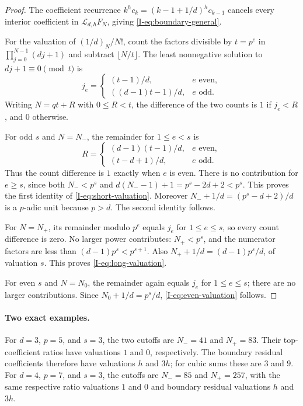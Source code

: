 \documentclass[11pt,letterpaper]{article}
\numberwithin{equation}{section}
\begin{document}
\begin{proof}
The coefficient recurrence
$k^hc_k=(k-1+1/d)^hc_{k-1}$ cancels every interior coefficient
in $\mathcal L_{d,h}F_N$, giving \eqref{I-eq:boundary-general}.

For the valuation of $(1/d)_N/N!$, count the factors divisible by
$t=p^e$ in $\prod_{j=0}^{N-1}(dj+1)$ and subtract $\lfloor N/t\rfloor$.
The least nonnegative solution to $dj+1\equiv0\pmod t$ is
\[
 j_e=\begin{cases}
 (t-1)/d,&e\text{ even},\\
 ((d-1)t-1)/d,&e\text{ odd}.
 \end{cases}
\]
Writing $N=qt+R$ with $0\leq R<t$, the difference of the two counts
is $1$ if $j_e<R$, and $0$ otherwise.

For odd $s$ and $N=N_-$, the remainder for $1\leq e<s$ is
\[
 R=\begin{cases}
 (d-1)(t-1)/d,&e\text{ even},\\
 (t-d+1)/d,&e\text{ odd}.
 \end{cases}
\]
Thus the count difference is $1$ exactly when $e$ is even.
There is no contribution for $e\geq s$, since both $N_-<p^s$ and
$d(N_--1)+1=p^s-2d+2<p^s$. This proves the first identity
of \eqref{I-eq:short-valuation}. Moreover
$N_-+1/d=(p^s-d+2)/d$ is a $p$-adic unit because $p>d$.
The second identity follows.

For $N=N_+$, its remainder modulo $p^e$ equals $j_e$ for
$1\leq e\leq s$, so every count difference is zero. No larger
power contributes: $N_+<p^s$, and the numerator factors are
less than $(d-1)p^s<p^{s+1}$. Also
$N_++1/d=(d-1)p^s/d$, of valuation $s$.
This proves \eqref{I-eq:long-valuation}.

For even $s$ and $N=N_0$, the remainder again equals $j_e$ for
$1\leq e\leq s$; there are no larger contributions. Since
$N_0+1/d=p^s/d$, \eqref{I-eq:even-valuation} follows.
\end{proof}

\paragraph{Two exact examples.}
For $d=3$, $p=5$, and $s=3$, the two cutoffs are $N_-=41$ and
$N_+=83$. Their top-coefficient ratios have valuations $1$ and $0$,
respectively. The boundary residual coefficients therefore have
valuations $h$ and $3h$; for cubic sums these are $3$ and $9$.
For $d=4$, $p=7$, and $s=3$, the cutoffs are $N_-=85$ and
$N_+=257$, with the same respective ratio valuations $1$ and $0$
and boundary residual valuations $h$ and $3h$.
\end{document}
